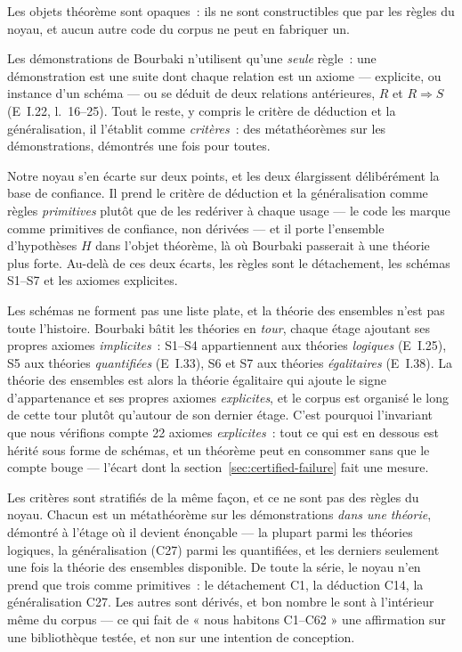 \documentclass[11pt]{article}
\theoremstyle{remark}\newtheorem{example}{Exemple}
\begin{document}
Les objets théorème sont opaques~: ils ne sont constructibles que par les règles du
noyau, et aucun autre code du corpus ne peut en fabriquer un.

Les démonstrations de Bourbaki n'utilisent qu'une \emph{seule} règle~: une
démonstration est une suite dont chaque relation est un axiome --- explicite, ou
instance d'un schéma --- ou se déduit de deux relations antérieures, $R$ et
$R \Rightarrow S$ (E~I.22, l.~16--25). Tout le reste, y compris le critère de
déduction et la généralisation, il l'établit comme \emph{critères}~: des
métathéorèmes sur les démonstrations, démontrés une fois pour toutes.

Notre noyau s'en écarte sur deux points, et les deux élargissent délibérément la base
de confiance. Il prend le critère de déduction et la généralisation comme règles
\emph{primitives} plutôt que de les redériver à chaque usage --- le code les marque
comme primitives de confiance, non dérivées --- et il porte l'ensemble d'hypothèses
$H$ dans l'objet théorème, là où Bourbaki passerait à une théorie plus forte. Au-delà
de ces deux écarts, les règles sont le détachement, les schémas S1--S7 et les axiomes
explicites.

Les schémas ne forment pas une liste plate, et la théorie des ensembles n'est pas
toute l'histoire. Bourbaki bâtit les théories en \emph{tour}, chaque étage ajoutant
ses propres axiomes \emph{implicites}~: S1--S4 appartiennent aux théories
\emph{logiques} (E~I.25), S5 aux théories \emph{quantifiées} (E~I.33), S6 et S7 aux
théories \emph{égalitaires} (E~I.38). La théorie des ensembles est alors la théorie
égalitaire qui ajoute le signe d'appartenance et ses propres axiomes
\emph{explicites}, et le corpus est organisé le long de cette tour plutôt qu'autour de
son dernier étage. C'est pourquoi l'invariant que nous vérifions compte 22 axiomes
\emph{explicites}~: tout ce qui est en dessous est hérité sous forme de schémas, et un
théorème peut en consommer sans que le compte bouge --- l'écart dont la
section~\ref{sec:certified-failure} fait une mesure.

Les critères sont stratifiés de la même façon, et ce ne sont pas des règles du
noyau. Chacun est un métathéorème sur les démonstrations \emph{dans une théorie},
démontré à l'étage où il devient énonçable --- la plupart parmi les théories logiques,
la généralisation (C27) parmi les quantifiées, et les derniers seulement une fois la
théorie des ensembles disponible. De toute la série, le noyau n'en prend que trois
comme primitives~: le détachement C1, la déduction C14, la généralisation C27. Les
autres sont dérivés, et bon nombre le sont à l'intérieur même du corpus --- ce qui
fait de « nous habitons C1--C62 » une affirmation sur une bibliothèque testée, et non
sur une intention de conception.
\end{document}
